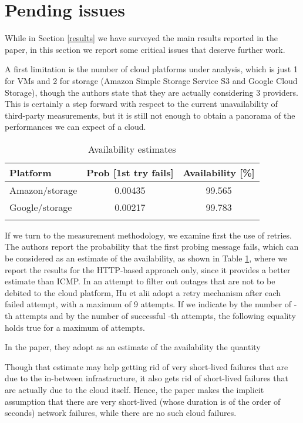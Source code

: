 \documentclass[runningheads,a4paper]{llncs}
\begin{document}
\section{Pending issues}
\label{issues}
While in Section \ref{results} we have surveyed the main results reported in the paper, in this section we report some critical issues that deserve further work.

A first limitation is the number of cloud platforms under analysis, which is just 1 for VMs and 2 for storage (Amazon Simple Storage Service S3 and Google Cloud Storage), though the authors state that they are actually considering 3 providers. This is certainly a step forward with respect to the current unavailability of third-party measurements, but it is still not enough to obtain a panorama of the performances we can expect of a cloud.

\begin{table}
\begin{center}
\begin{tabular}{lcc}
\toprule
Platform & Prob [1st try fails] & Availability [\%]\\
\midrule
Amazon/storage & 0.00435 & 99.565\\
Google/storage & 0.00217 & 99.783\\
\bottomrule\\
\end{tabular}
\caption{Availability estimates}
\label{table:estimates}
\end{center}\end{table}

If we turn to the measurement methodology, we examine first the use of retries. The authors report the probability that the first probing message fails, which can be considered as an estimate of the availability, as shown in Table \ref{table:estimates}, where we report the results for the HTTP-based approach only, since it provides a better estimate than ICMP.  In an attempt to filter out outages that are not to be debited to the cloud platform, Hu et alii adopt a retry mechanism after each failed attempt, with a maximum of 9 attempts. If we indicate by  the number of -th attempts and by  the number of successful -th attempts, the following equality holds true for a maximum of  attempts.

In the paper, they adopt as an estimate of the availability the quantity


Though that estimate may help getting rid of very short-lived failures that are due to the in-between infrastructure, it also gets rid of short-lived failures that are actually due to the cloud itself. Hence, the paper makes the implicit assumption that there are very short-lived (whose duration is of the order of seconds) network failures, while there are no such cloud failures. 
\end{document}
